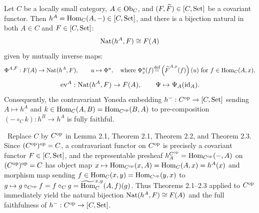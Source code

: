 \documentclass[10pt,a4paper]{article}
\begin{document}
\begin{theorem}
Let $C$ be a locally small category, $A \in {\textrm{Ob}}_C$, and $(F, {\widetilde{F}\textrm{}}) \in [C, {\textrm{Set}}]$ be a covariant functor. Then $h^A = {\textrm{Hom}}_C(A, -) \in [C, {\textrm{Set}}]$, and there is a bijection natural in both $A \in C$ and $F \in [C, {\textrm{Set}}]$:
$${\textrm{Nat}}(h^A, F) \cong F(A)$$
given by mutually inverse maps:
$$\Phi^{A,F} : F(A) \to {\textrm{Nat}}(h^A, F), \qquad u \mapsto \Phi^u, \quad \textrm{where } \Phi^u_x(f) {\stackrel{{\textrm{def}}}{=}} \left({\widetilde{F}\textrm{}}^{A,x}(f)\right)(u) \textrm{ for } f \in {\textrm{Hom}}_C(A,x),$$
$$\mathrm{ev}^A : {\textrm{Nat}}(h^A, F) \to F(A), \qquad \Psi \mapsto \Psi_A({\textrm{id}}_A).$$
Consequently, the contravariant Yoneda embedding $h^- : C^{\textrm{op}} \to [C, {\textrm{Set}}]$ sending $A \mapsto h^A$ and $k \in {\textrm{Hom}}_C(A,B) = {\textrm{Hom}}_{C^{\textrm{op}}}(B,A)$ to pre-composition $(- \circ_C k) : h^B \to h^A$ is fully faithful.
\end{theorem}
\myprf\ Replace $C$ by $C^{\textrm{op}}$ in Lemma 2.1, Theorem 2.1, Theorem 2.2, and Theorem 2.3. Since $(C^{\textrm{op}})^{\textrm{op}} = C$, a contravariant functor on $C^{\textrm{op}}$ is precisely a covariant functor $F \in [C, {\textrm{Set}}]$, and the representable presheaf $h_A^{C^{\textrm{op}}} = {\textrm{Hom}}_{C^{\textrm{op}}}(-, A)$ on $(C^{\textrm{op}})^{\textrm{op}} = C$ has object map $x \mapsto {\textrm{Hom}}_{C^{\textrm{op}}}(x, A) = {\textrm{Hom}}_C(A, x) = h^A(x)$ and morphism map sending $f \in {\textrm{Hom}}_C(x,y) = {\textrm{Hom}}_{C^{\textrm{op}}}(y,x)$ to $g \mapsto g \circ_{C^{\textrm{op}}} f = f \circ_C g = {\widetilde{{\textrm{Hom}}}\textrm{}}_C^{x,y}(A, f)(g)$. Thus Theorems 2.1--2.3 applied to $C^{\textrm{op}}$ immediately yield the natural bijection ${\textrm{Nat}}(h^A, F) \cong F(A)$ and the full faithfulness of $h^- : C^{\textrm{op}} \to [C, {\textrm{Set}}]$. \myqed
\end{document}
